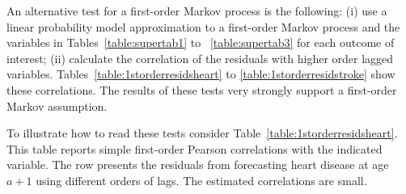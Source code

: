 \noindent An alternative test for a first-order Markov process is the following: (i) use a linear probability model approximation to a first-order Markov process and the variables in Tables~\ref{table:supertab1} to ~\ref{table:supertab3} for each outcome of interest; (ii) calculate the correlation of the residuals with higher order lagged variables. Tables~\ref{table:1storderresidsheart} to \ref{table:1storderresidstroke} show these correlations. The results of these tests very strongly support a first-order Markov assumption.

\noindent To illustrate how to read these tests consider Table~\ref{table:1storderresidsheart}. This table reports simple first-order Pearson correlations with the indicated variable. The row presents the residuals from forecasting heart disease at age $a+1$ using different orders of lags. The estimated correlations are small.

